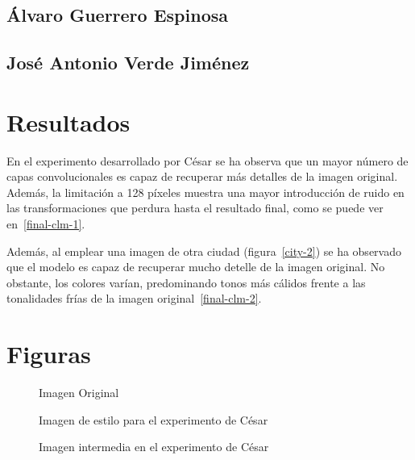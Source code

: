 \documentclass[es]{uc3mreport}
\begin{document}
\begin{report}
            \subsection{Álvaro Guerrero Espinosa}

            \subsection{José Antonio Verde Jiménez}


        \section{Resultados}

            En el experimento desarrollado por César se ha observa que un mayor
            número de capas convolucionales es capaz de recuperar más detalles
            de la imagen original. Además, la limitación a 128 píxeles muestra
            una mayor introducción de ruido en las transformaciones que perdura
            hasta el resultado final, como se puede ver en~\ref{final-clm-1}.

            Además, al emplear una imagen de otra ciudad (figura~\ref{city-2})
            se ha observado que el modelo es capaz de recuperar mucho detelle
            de la imagen original. No obstante, los colores varían,
            predominando tonos más cálidos frente a las tonalidades frías de la
            imagen original~\ref{final-clm-2}.


    \section{Figuras}

    \begin{figure}
        \caption{Imagen Original}
        \label{original}
    \end{figure}

    \begin{figure}
        \caption{Imagen de estilo para el experimento de César}
        \label{joan-miro}
    \end{figure}

    \begin{figure}
        \caption{Imagen intermedia en el experimento de César}
        \label{intermedio-clm}
    \end{figure}


\end{report}
\end{document}
